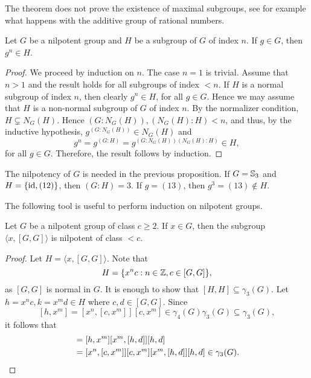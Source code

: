 The theorem does not prove the existence of maximal subgroups, see for example what happens with
the additive group of rational numbers. 

\begin{proposition}
	\label{pro:g^n}
	Let $G$ be a nilpotent group and $H$ be a subgroup of $G$ of index $n$. If 
	$g\in G$, then $g^n\in H$.
\end{proposition}

\begin{proof}
	We proceed by induction on $n$. The case $n=1$ is trivial. Assume  that $n>1$ and the result holds 
	for all subgroups of index $<n$. If $H$ is  a normal subgroup of index $n$, then clearly $g^n\in H$, for all $g\in G$. 
	Hence we may assume that $H$ is a non-normal subgroup of $G$ of index $n$. By the normalizer condition, $H\subsetneq N_G(H)$. Hence
	$(G:N_G(H)),(N_G(H):H)<n$, and thus, by the inductive hypothesis, $g^{(G:N_G(H))}\in N_G(H)$ and
	\[
		g^n=g^{(G:H)}=g^{(G:N_G(H))(N_G(H):H)}\in H, 
	\]
	for all $g\in G$. Therefore, the result follows by induction.
\end{proof}

\begin{example}
The nilpotency of $G$ is needed in the previous proposition. 
If $G=\mathbb{S}_3$ and $H=\{\operatorname{id},(12)\}$, then $(G:H)=3$. If 
$g=(13)$, then $g^{3}=(13)\not\in H$. 	
\end{example}

The following tool is useful to perform induction 
on nilpotent groups.  

\begin{lemma}
	\label{lem:a[GG]}
	Let $G$ be a nilpotent group of class $c\geq2$. If $x\in G$, then the subgroup 
	$\langle x,[G,G]\rangle$ is nilpotent of class $<c$.
\end{lemma}

\begin{proof}
	Let $H=\langle x,[G,G]\rangle$.   Note that  
	\[
		H=\{x^nc:n\in\mathbb{Z},c\in [G,G]\},
	\]
	as $[G,G]$ is normal in $G$. It is enough to show that   
	$[H,H]\subseteq\gamma_3(G)$. Let $h=x^nc,k=x^md\in H$
	where $c,d\in [G,G]$. 
	Since 
	\[
	[h,x^m]=[x^n,[c,x^m]][c,x^m]\in\gamma_4(G)\gamma_3(G)\subseteq\gamma_3(G),
	\]
	it follows that  
	\begin{align*}
		[h,k]&=[h,x^m][x^m,[h,d]][h,d]\\
			&=[x^n,[c,x^m]][c,x^m][x^m,[h,d]][h,d]\in\gamma_3(G).\qedhere
	\end{align*}
\end{proof}


